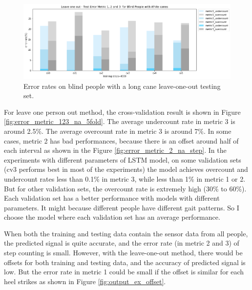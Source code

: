 \documentclass[11pt]{article}
\begin{document}
\begin{figure}[ht]
\centering
\includegraphics[scale=0.5]{error_metric_wc_10fold_test4000}
\caption{Error rates on blind people with a long cane leave-one-out testing set.}
\label{fig:error_metric_wc_10fold_test4000}
\end{figure}

For leave one person out method, the cross-validation result is shown in Figure \ref{fig:error_metric_123_na_5fold}.
The average undercount rate in metric 3 is around 2.5\%. The average overcount rate in metric 3 is around 7\%.
In some cases, metric 2 has bad performances, because there is an offset around half of each interval as shown in the Figure \ref{fig:error_metric_2_na_step}. 
In the experiments with different parameters of LSTM model, on some validation sets (cv3 performs best in most of the experiments) the model achieves overcount and undercount rates less than 0.1\% in metric 3, while less than 1\% in metric 1 or 2. But for other validation sets, the overcount rate is extremely high (30\% to 60\%). Each validation set has a better performance with models with different parameters. It might because different people have different gait patterns. So I choose the model where each validation set has an average performance. 

When both the training and testing data contain the sensor data from all people, the predicted signal is quite accurate, and the error rate (in metric 2 and 3) of step counting is small. However, with the leave-one-out method, there would be offsets for both training and testing data, and the accuracy of predicted signal is low. But the error rate in metric 1 could be small if the offset is similar for each heel strikes as shown in Figure \ref{fig:output_ex_offset}. 
\end{document}
